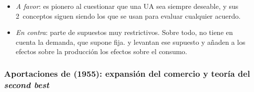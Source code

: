 \documentclass[11pt]{article}
\begin{document}
\begin{itemize}
\item \emph{A favor}: es pionero al cuestionar que una UA sea siempre deseable, y sus 2~conceptos siguen siendo los que se usan para evaluar cualquier acuerdo.
\item \emph{En contra}: parte de supuestos muy restrictivos. Sobre todo, no tiene en cuenta la demanda, que supone fija. \textcite{Meade1955Customs} y \textcite{Lipsey1957Theory} levantan ese supuesto y añaden a los efectos sobre la producción los efectos sobre el consumo.
\end{itemize}

\subsubsection{Aportaciones de  (1955): expansión del comercio y teoría del \emph{second best}}\label{sec:meade}
\end{document}
